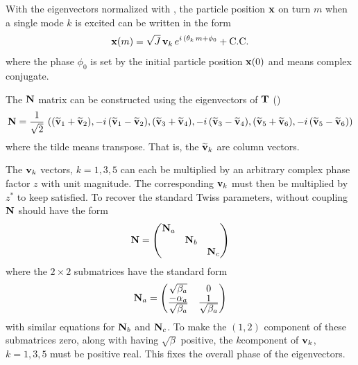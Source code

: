 With the eigenvectors normalized with , the particle position ${\bf x}$ on turn $m$ when a
single mode $k$ is excited can be written in the form
\begin{equation}
  {\bf x}(m) = \sqrt{J} \, {\bf v}_k \, e^{i \, (\theta_k \, m + \phi_0} + \text{C.C.}
  \label{x2jv}
\end{equation}
where the phase $\phi_0$ is set by the initial particle position ${\bf x}(0)$ and  means
complex conjugate.

The ${\bf N}$ matrix can be constructed using the eigenvectors of ${\bf T}$ ()
\begin{equation}
  {\bf N} = \frac{1}{\sqrt{2}} \, \left( 
    (\widetilde{{\bf v}}_1 + \widetilde{{\bf v}}_2), -i \, (\widetilde{{\bf v}}_1 - \widetilde{{\bf v}}_2), 
    (\widetilde{{\bf v}}_3 + \widetilde{{\bf v}}_4), -i \, (\widetilde{{\bf v}}_3 - \widetilde{{\bf v}}_4), 
    (\widetilde{{\bf v}}_5 + \widetilde{{\bf v}}_6), -i \, (\widetilde{{\bf v}}_5 - \widetilde{{\bf v}}_6)
  \right)
\end{equation}
where the tilde means transpose. That is, the $\widetilde{{\bf v}}_k$ are column vectors.

The ${\bf v}_k$ vectors, $k = 1, 3, 5$ can each be multiplied by an arbitrary complex phase factor $z$
with unit magnitude. The corresponding ${\bf v}_k$ must then be multiplied by $z^*$
to keep  satisfied. To recover the standard Twiss parameters, without coupling ${\bf N}$
should have the form
\begin{equation}
  {\bf N} = \begin{pmatrix}
    {\bf N}_a &        &        \\
           & {\bf N}_b &        \\
           &        & {\bf N}_c
  \end{pmatrix}
\end{equation}
where the $2 \times 2$ submatrices have the standard form
\begin{equation}
  {\bf N}_a = \begin{pmatrix}
    \sqrt{\beta_a}                                   & 0 \cr
    \frac{\textstyle -\alpha_a}{\textstyle \sqrt{\beta_a}} & \frac{\textstyle 1}{\textstyle \sqrt{\beta_a}}
  \end{pmatrix}
\end{equation}
with similar equations for ${\bf N}_b$ and ${\bf N}_c$. To make the $(1,2)$ component of these submatrices
zero, along with having $\sqrt{\beta}$ positive, the $k$\Th component of ${\bf v}_k$, $k = 1, 3, 5$
must be positive real. This fixes the overall phase of the eigenvectors.

